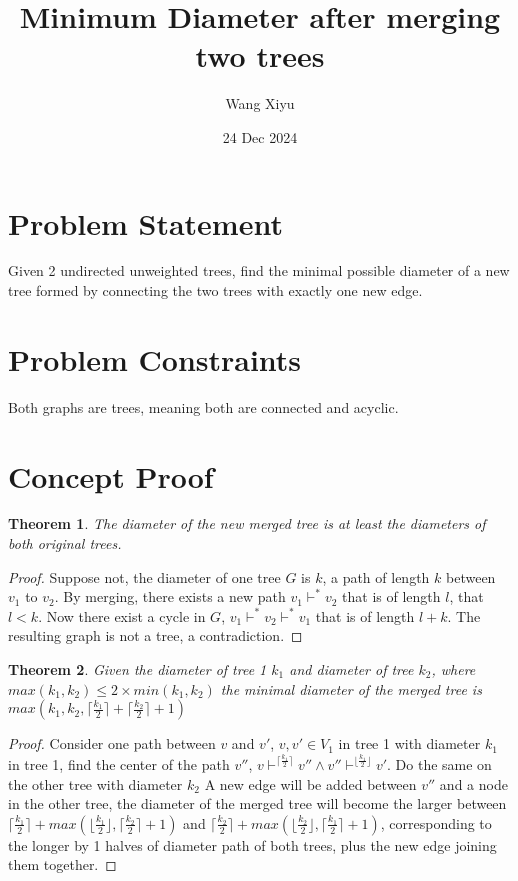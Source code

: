 \documentclass{article}
\newtheorem{theorem}{Theorem}[section]
\begin{document}
\title{Minimum Diameter after merging two trees}
\author{Wang Xiyu}
\date{24 Dec 2024}
\maketitle

\section*{Problem Statement}
Given 2 undirected unweighted trees, find the minimal possible diameter of a new tree formed by connecting the two trees with exactly one new edge.
\section*{Problem Constraints}
Both graphs are trees, meaning both are connected and acyclic.
\section*{Concept Proof}
\begin{theorem}
The diameter of the new merged tree is at least the diameters of both original trees.
\end{theorem}
\begin{proof}
    Suppose not, the diameter of one tree $G$ is $k$, a path of length $k$ between $v_1$ to $v_2$.
    By merging, there exists a new path $v_1 \vdash^* v_2$ that is of length $l$, that $l < k$.
    Now there exist a cycle in $G$, $v_1 \vdash^* v_2 \vdash^* v_1$ that is of length $l + k$. 
    The resulting graph is not a tree, a contradiction.  
\end{proof}
\begin{theorem}
    Given the diameter of tree 1 $k_1$ and diameter of tree $k_2$, where $max(k_1, k_2) \leq 2 \times min(k_1, k_2)$  the minimal diameter of the merged tree is
    $max(k_1, k_2, \lceil \frac{k_1}{2} \rceil + \lceil \frac{k_2}{2} \rceil + 1)$
\end{theorem}
\begin{proof}
    Consider one path between $v$ and $v'$, $v, v' \in V_1$ in tree 1 with diameter $k_1$
    in tree 1, find the center of the path $v''$, $v \vdash^{\lceil \frac{k_1}{2} \rceil} v'' \land v'' \vdash^{\lfloor \frac{k_1}{2} \rfloor} v'$.
    Do the same on the other tree with diameter $k_2$
    A new edge will be added between $v''$ and a node in the other tree, the diameter of the merged tree will become the larger between $\lceil \frac{k_1}{2} \rceil + max(\lfloor \frac{k_1}{2} \rfloor, \lceil \frac{k_2}{2} \rceil + 1)$ and
    $\lceil \frac{k_2}{2} \rceil + max(\lfloor \frac{k_2}{2} \rfloor, \lceil \frac{k_1}{2} \rceil + 1)$, corresponding to the longer by 1 halves of diameter path of both trees, plus the new edge joining them together.
\end{proof}
\end{document}

